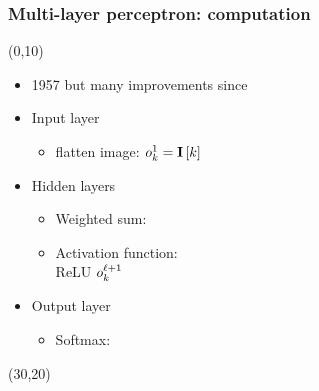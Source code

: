 \begin{frame}
  \frametitle{Multi-layer perceptron: computation}
  \begin{textblock}{50}(0,10)
    \begin{itemize}
    \item 1957 but many improvements since
    \item<2-> Input layer
      \begin{itemize}
      \item flatten image: $o^{1}_{k} = \mathbf{I} \left [ k \right ]$
      \end{itemize}
    \item<3-> Hidden layers
      \begin{itemize}
      \item Weighted sum:
      \item Activation function:\\
        ReLU $o^{\ell+1}_{k}$
      \end{itemize}
    \item<4-> Output layer
      \begin{itemize}
      \item Softmax:
      \end{itemize}
    \end{itemize}
  \end{textblock}
  \begin{textblock}{70}(30,20)
\end{textblock}
\end{frame}
